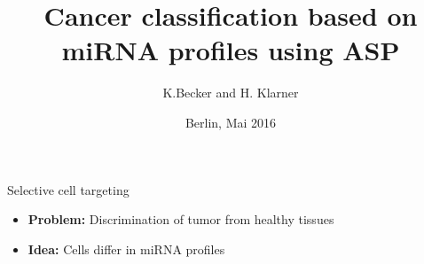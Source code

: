 \documentclass[10pt,dvipsnames]{beamer}
\title{Cancer classification based on miRNA profiles using ASP}
\author{K.Becker and H. Klarner}
\date{Berlin, Mai 2016}
\institute{
Freie Universität Berlin, Germany
}
\begin{document}
\frame{\titlepage}




\begin{frame}{Selective cell targeting}
\begin{itemize}
\item \textbf{Problem:} Discrimination of tumor from healthy tissues
\end{itemize}

\vspace{0.5cm}
\begin{center}
\end{center}
\vspace{0.5cm}

\begin{itemize}
\item<2> \textbf{Idea:} Cells differ in miRNA profiles
\end{itemize}
\end{frame}
\end{document}
